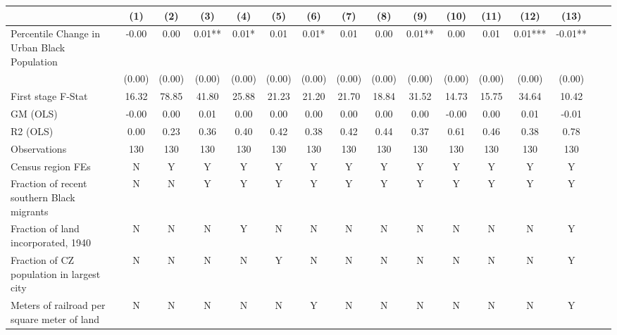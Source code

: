  \begin{tabular}{l*{15}{c}} \toprule
                    &\multicolumn{1}{c}{(1)}   &\multicolumn{1}{c}{(2)}   &\multicolumn{1}{c}{(3)}   &\multicolumn{1}{c}{(4)}   &\multicolumn{1}{c}{(5)}   &\multicolumn{1}{c}{(6)}   &\multicolumn{1}{c}{(7)}   &\multicolumn{1}{c}{(8)}   &\multicolumn{1}{c}{(9)}   &\multicolumn{1}{c}{(10)}   &\multicolumn{1}{c}{(11)}   &\multicolumn{1}{c}{(12)}   &\multicolumn{1}{c}{(13)}   \\
\midrule
Percentile Change in Urban Black Population& -0.00   &  0.00   &  0.01** &  0.01*  &  0.01   &  0.01*  &  0.01   &  0.00   &  0.01** &  0.00   &  0.01   &  0.01***& -0.01** \\
                    &(0.00)   &(0.00)   &(0.00)   &(0.00)   &(0.00)   &(0.00)   &(0.00)   &(0.00)   &(0.00)   &(0.00)   &(0.00)   &(0.00)   &(0.00)   \\
\midrule
First stage F-Stat  & 16.32   & 78.85   & 41.80   & 25.88   & 21.23   & 21.20   & 21.70   & 18.84   & 31.52   & 14.73   & 15.75   & 34.64   & 10.42   \\
GM (OLS)            & -0.00   &  0.00   &  0.01   &  0.00   &  0.00   &  0.00   &  0.00   &  0.00   &  0.00   & -0.00   &  0.00   &  0.01   & -0.01   \\
R2 (OLS)            &  0.00   &  0.23   &  0.36   &  0.40   &  0.42   &  0.38   &  0.42   &  0.44   &  0.37   &  0.61   &  0.46   &  0.38   &  0.78   \\
Observations        &   130   &   130   &   130   &   130   &   130   &   130   &   130   &   130   &   130   &   130   &   130   &   130   &   130   \\
Census region FEs   &     N   &     Y   &     Y   &     Y   &     Y   &     Y   &     Y   &     Y   &     Y   &     Y   &     Y   &     Y   &     Y   \\
Fraction of recent southern Black migrants&     N   &     N   &     Y   &     Y   &     Y   &     Y   &     Y   &     Y   &     Y   &     Y   &     Y   &     Y   &     Y   \\
Fraction of land incorporated, 1940&     N   &     N   &     N   &     Y   &     N   &     N   &     N   &     N   &     N   &     N   &     N   &     N   &     Y   \\
Fraction of CZ population in largest city&     N   &     N   &     N   &     N   &     Y   &     N   &     N   &     N   &     N   &     N   &     N   &     N   &     Y   \\
Meters of railroad per square meter of land&     N   &     N   &     N   &     N   &     N   &     Y   &     N   &     N   &     N   &     N   &     N   &     N   &     Y   \\

\end{tabular}
